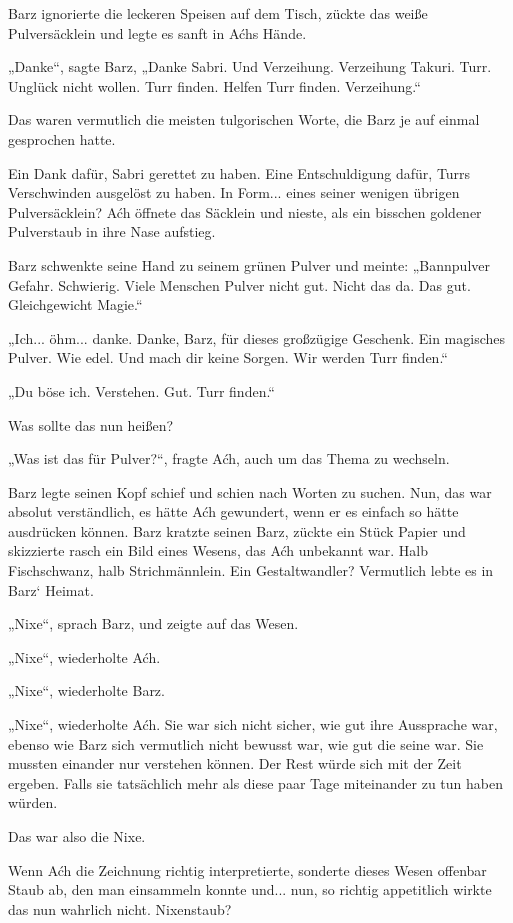 Barz ignorierte die leckeren Speisen auf dem Tisch, zückte das weiße Pulversäcklein und legte es sanft in Aćhs Hände.

„Danke“, sagte Barz, „Danke Sabri. Und Verzeihung. Verzeihung Takuri. Turr. Unglück nicht wollen. Turr finden. Helfen Turr finden. Verzeihung.“

Das waren vermutlich die meisten tulgorischen Worte, die Barz je auf einmal gesprochen hatte.

Ein Dank dafür, Sabri gerettet zu haben. Eine Entschuldigung dafür, Turrs Verschwinden ausgelöst zu haben. In Form... eines seiner wenigen übrigen Pulversäcklein? Aćh öffnete das Säcklein und nieste, als ein bisschen goldener Pulverstaub in ihre Nase aufstieg.

Barz schwenkte seine Hand zu seinem grünen Pulver und meinte: „Bannpulver Gefahr. Schwierig. Viele Menschen Pulver nicht gut. Nicht das da. Das gut. Gleichgewicht Magie.“

„Ich... öhm... danke. Danke, Barz, für dieses großzügige Geschenk. Ein magisches Pulver. Wie edel. Und mach dir keine Sorgen. Wir werden Turr finden.“

„Du böse ich. Verstehen. Gut. Turr finden.“

Was sollte das nun heißen?

„Was ist das für Pulver?“, fragte Aćh, auch um das Thema zu wechseln.

Barz legte seinen Kopf schief und schien nach Worten zu suchen. Nun, das war absolut verständlich, es hätte Aćh gewundert, wenn er es einfach so hätte ausdrücken können. Barz kratzte seinen Barz, zückte ein Stück Papier und skizzierte rasch ein Bild eines Wesens, das Aćh unbekannt war. Halb Fischschwanz, halb Strichmännlein. Ein Gestaltwandler? Vermutlich lebte es in Barz‘ Heimat.

„Nixe“, sprach Barz, und zeigte auf das Wesen.

„Nixe“, wiederholte Aćh.

„Nixe“, wiederholte Barz.

„Nixe“, wiederholte Aćh. Sie war sich nicht sicher, wie gut ihre Aussprache war, ebenso wie Barz sich vermutlich nicht bewusst war, wie gut die seine war. Sie mussten einander nur verstehen können. Der Rest würde sich mit der Zeit ergeben. Falls sie tatsächlich mehr als diese paar Tage miteinander zu tun haben würden.

Das war also die Nixe.

Wenn Aćh die Zeichnung richtig interpretierte, sonderte dieses Wesen offenbar Staub ab, den man einsammeln konnte und... nun, so richtig appetitlich wirkte das nun wahrlich nicht. Nixenstaub?

